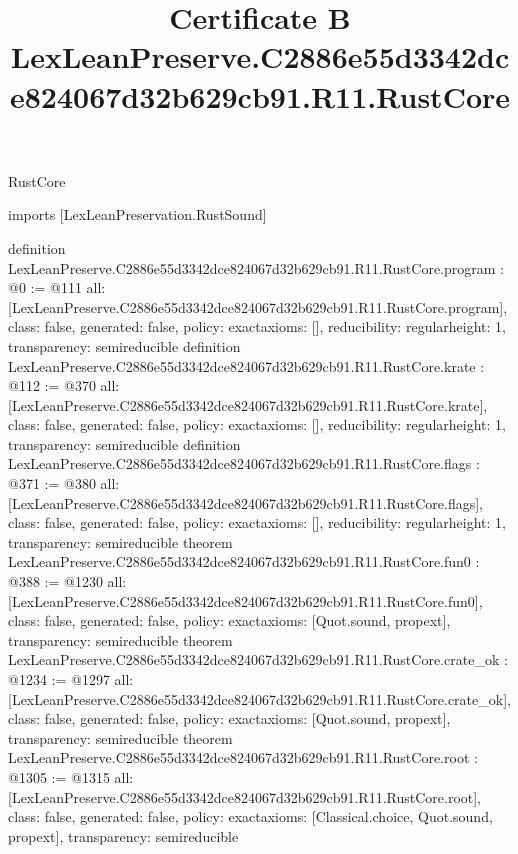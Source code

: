 \begin{lexlean}{RustCore}
\title{Certificate B LexLeanPreserve.C2886e55d3342dce824067d32b629cb91.R11.RustCore}
\begin{coremodule}
imports [LexLeanPreservation.RustSound]

definition LexLeanPreserve.C2886e55d3342dce824067d32b629cb91.R11.RustCore.program : @0 := @111 {
  all: [LexLeanPreserve.C2886e55d3342dce824067d32b629cb91.R11.RustCore.program],
  class: false,
  generated: false,
  policy: exact{axioms: []},
  reducibility: regular{height: 1},
  transparency: semireducible
}
definition LexLeanPreserve.C2886e55d3342dce824067d32b629cb91.R11.RustCore.krate : @112 := @370 {
  all: [LexLeanPreserve.C2886e55d3342dce824067d32b629cb91.R11.RustCore.krate],
  class: false,
  generated: false,
  policy: exact{axioms: []},
  reducibility: regular{height: 1},
  transparency: semireducible
}
definition LexLeanPreserve.C2886e55d3342dce824067d32b629cb91.R11.RustCore.flags : @371 := @380 {
  all: [LexLeanPreserve.C2886e55d3342dce824067d32b629cb91.R11.RustCore.flags],
  class: false,
  generated: false,
  policy: exact{axioms: []},
  reducibility: regular{height: 1},
  transparency: semireducible
}
theorem LexLeanPreserve.C2886e55d3342dce824067d32b629cb91.R11.RustCore.fun0 : @388 := @1230 {
  all: [LexLeanPreserve.C2886e55d3342dce824067d32b629cb91.R11.RustCore.fun0],
  class: false,
  generated: false,
  policy: exact{axioms: [Quot.sound, propext]},
  transparency: semireducible
}
theorem LexLeanPreserve.C2886e55d3342dce824067d32b629cb91.R11.RustCore.crate_ok : @1234 := @1297 {
  all: [LexLeanPreserve.C2886e55d3342dce824067d32b629cb91.R11.RustCore.crate_ok],
  class: false,
  generated: false,
  policy: exact{axioms: [Quot.sound, propext]},
  transparency: semireducible
}
theorem LexLeanPreserve.C2886e55d3342dce824067d32b629cb91.R11.RustCore.root : @1305 := @1315 {
  all: [LexLeanPreserve.C2886e55d3342dce824067d32b629cb91.R11.RustCore.root],
  class: false,
  generated: false,
  policy: exact{axioms: [Classical.choice, Quot.sound, propext]},
  transparency: semireducible
}


\end{coremodule}
\end{lexlean}
